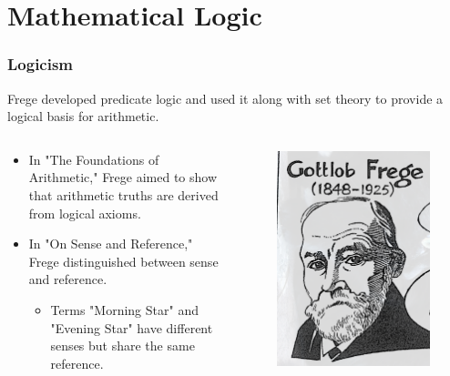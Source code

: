 \documentclass[unicode, 14pt, aspectratio=169]{beamer}
\begin{document}
\section{Mathematical Logic}
\begin{frame}
  \frametitle{Logicism}
  {\large Frege developed predicate logic and used it along with set theory to provide a logical basis for arithmetic.}
  \begin{columns}
    \begin{column}{0.8\textwidth}
      \begin{itemize}
      \item In "The Foundations of Arithmetic," Frege aimed to show that arithmetic truths are derived from logical axioms.
      \item In "On Sense and Reference," Frege distinguished between sense and reference.
        \begin{itemize}
        \item Terms "Morning Star" and "Evening Star" have different senses but share the same reference.
        \end{itemize}
      \end{itemize}
    \end{column}    
    \begin{column}{0.2\textwidth}
      \begin{figure}
        \includegraphics[width=1\textwidth]{images/frege.png}

\end{figure}
\end{column}
\end{columns}
\end{frame}
\end{document}
